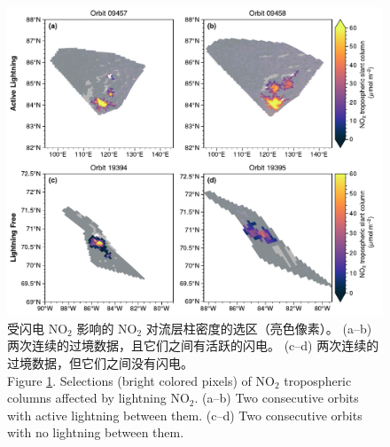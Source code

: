 \begin{figure}[!htbp]
\centering
\includegraphics[width=13cm]{./figures/arctic_consecutive_orbits.pdf}
\caption{
受闪电 NO$_2$ 影响的 NO$_2$ 对流层柱密度的选区（亮色像素）。
(a--b) 两次连续的过境数据，且它们之间有活跃的闪电。
(c--d) 两次连续的过境数据，但它们之间没有闪电。\\
Figure \ref{fig:consecutive_orbits}. Selections (bright colored pixels) of NO$_2$ tropospheric columns affected by lightning NO$_2$.
(a--b) Two consecutive orbits with active lightning between them.
(c--d) Two consecutive orbits with no lightning between them.
}
\label{fig:consecutive_orbits}
\end{figure}


